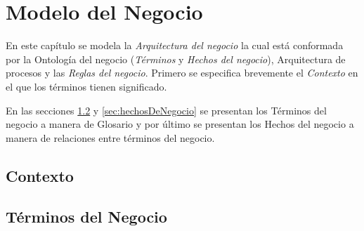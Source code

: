 \chapter{Modelo del Negocio}	
\label{cap:reqSist}

	En este capítulo se modela la {\em Arquitectura del negocio} la cual está conformada por la Ontología del negocio ({\em Términos} y {\em Hechos del negocio}), Arquitectura de procesos y las {\em Reglas del negocio}. Primero se especifica brevemente el {\em Contexto} en el que los términos tienen significado.
	
	En las secciones \ref{sec:terminosDeNegocio} y \ref{sec:hechosDeNegocio} se presentan los Términos del negocio a manera de Glosario y por último se presentan los Hechos del negocio a manera de relaciones entre términos del negocio.

\section{Contexto}

	
	
\section{Términos del Negocio}
\label{sec:terminosDeNegocio}

